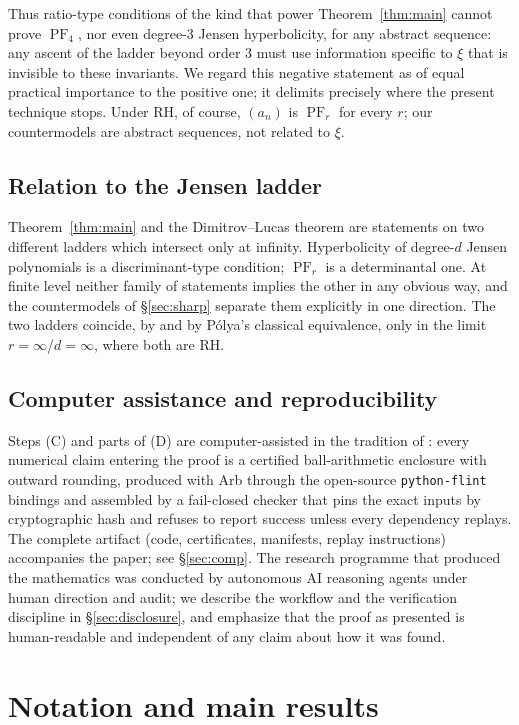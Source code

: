\documentclass[11pt]{amsart}
\theoremstyle{definition}
\theoremstyle{remark}
\DeclareMathOperator{\PF}{PF}
\begin{document}
Thus ratio-type conditions of the kind that power Theorem~\ref{thm:main}
cannot prove $\PF_4$, nor even degree-$3$ Jensen hyperbolicity, for any
abstract sequence: any ascent of the ladder beyond order $3$ must use
information specific to $\xi$ that is invisible to these invariants.
We regard this negative statement as of equal practical importance to
the positive one; it delimits precisely where the present technique
stops. Under RH, of course, $(a_n)$ is $\PF_r$ for every $r$; our
countermodels are abstract sequences, not related to $\xi$.

\subsection*{Relation to the Jensen ladder}
Theorem~\ref{thm:main} and the Dimitrov--Lucas theorem \cite{DL11} are
statements on two different ladders which intersect only at infinity.
Hyperbolicity of degree-$d$ Jensen polynomials is a discriminant-type
condition; $\PF_r$ is a determinantal one. At finite level neither
family of statements implies the other in any obvious way, and the
countermodels of \S\ref{sec:sharp} separate them explicitly in one
direction. The two ladders coincide, by \cite{ASW52,Edrei52} and by
P\'olya's classical equivalence, only in the limit
$r=\infty$/$d=\infty$, where both are RH.

\subsection*{Computer assistance and reproducibility}
Steps (C) and parts of (D) are computer-assisted in the tradition of
\cite{PlattTrudgian}: every numerical claim entering the proof is a
certified ball-arithmetic enclosure with outward rounding, produced
with Arb through the open-source \texttt{python-flint} bindings and
assembled by a
fail-closed checker that pins the exact inputs by cryptographic hash
and refuses to report success unless every dependency replays. The
complete artifact (code, certificates, manifests, replay instructions)
accompanies the paper; see \S\ref{sec:comp}. The research programme
that produced the mathematics was conducted by autonomous AI reasoning
agents under human direction and audit; we describe the workflow and
the verification discipline in \S\ref{sec:disclosure}, and emphasize
that the proof as presented is human-readable and independent of any
claim about how it was found.

\section{Notation and main results}\label{sec:notation}
\end{document}
